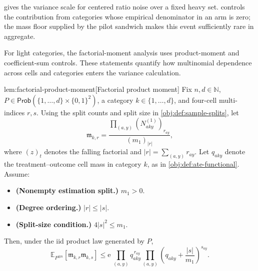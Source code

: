 \documentclass[11pt]{article}
\begin{document}
 gives the variance scale for centered ratio noise over a fixed heavy set.  controls the contribution from categories whose empirical denominator in an arm is zero; the mass floor supplied by the pilot sandwich makes this event sufficiently rare in aggregate.

For light categories, the factorial-moment analysis uses product-moment and coefficient-sum controls. These statements quantify how multinomial dependence across cells and categories enters the variance calculation.

\begin{lemmav}{lem:factorial-product-moment}[Factorial product moment]
Fix \(n,d\in\mathbb N\), \(P\in\mathsf{Prob}(\{1,\ldots,d\}\times\{0,1\}^2)\), a category \(k\in\{1,\ldots,d\}\), and four-cell multi-indices \(r,s\). Using the split counts and split size in \cref{obj:def:sample-splits}, let
\[
\mathfrak m_{k,r}
=
\frac{\prod_{(a,y)}(N^{(1)}_{aky})_{r_{ay}}}{(m_1)_{|r|}},
\]
where \((z)_t\) denotes the falling factorial and \(|r|=\sum_{(a,y)}r_{ay}\). Let \(q_{aky}\) denote the treatment--outcome cell mass in category \(k\), as in \cref{obj:def:ate-functional}. Assume:
\begin{itemize}
\item \textbf{(Nonempty estimation split.)} \(m_1>0\).
\item \textbf{(Degree ordering.)} \(|r|\le |s|\).
\item \textbf{(Split-size condition.)} \(4|s|^2\le m_1\).
\end{itemize}
Then, under the iid product law generated by \(P\),
\[
\mathbb E_{P^{\otimes n}}\!\left[\mathfrak m_{k,r}\mathfrak m_{k,s}\right]
\le \mathrm e\,\prod_{(a,y)}q_{aky}^{\,r_{ay}}
\prod_{(a,y)}
\left(q_{aky}+\frac{|s|}{m_1}\right)^{s_{ay}} .
\]
\end{lemmav}
\end{document}
